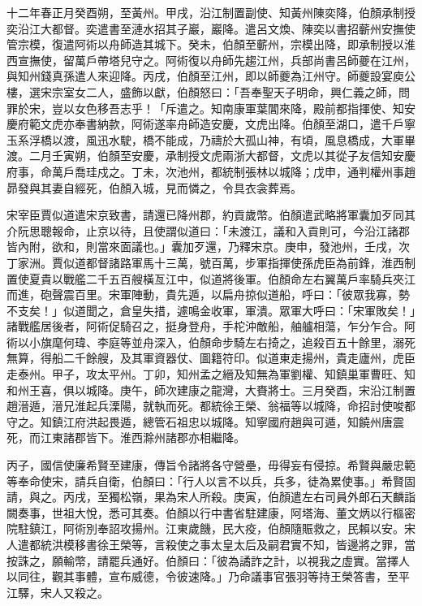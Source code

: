 \begin{pinyinscope}
 十二年春正月癸酉朔，至黃州。甲戌，沿江制置副使、知黃州陳奕降，伯顏承制授奕沿江大都督。奕遣書至漣水招其子巖，巖降。遣呂文煥、陳奕以書招蘄州安撫使管宗模，復遣阿術以舟師造其城下。癸未，伯顏至蘄州，宗模出降，即承制授以淮西宣撫使，留萬戶帶塔兒守之。阿術復以舟師先趨江州，兵部尚書呂師夔在江州，與知州錢真孫遣人來迎降。丙戌，伯顏至江州，即以師夔為江州守。師夔設宴庾公樓，選宋宗室女二人，盛飾以獻，伯顏怒曰：「吾奉聖天子明命，興仁義之師，問罪於宋，豈以女色移吾志乎！「斥遣之。知南康軍葉閶來降，殿前都指揮使、知安慶府範文虎亦奉書納款，阿術遂率舟師造安慶，文虎出降。伯顏至湖口，遣千戶寧玉系浮橋以渡，風迅水駛，橋不能成，乃禱於大孤山神，有頃，風息橋成，大軍畢渡。二月壬寅朔，伯顏至安慶，承制授文虎兩浙大都督，文虎以其從子友信知安慶府事，命萬戶喬珪戍之。丁未，次池州，都統制張林以城降；戊申，通判權州事趙昴發與其妻自經死，伯顏入城，見而憐之，令具衣衾葬焉。



 宋宰臣賈似道遣宋京致書，請還已降州郡，約貢歲幣。伯顏遣武略將軍囊加歹同其介阮思聰報命，止京以待，且使謂似道曰：「未渡江，議和入貢則可，今沿江諸郡皆內附，欲和，則當來面議也。」囊加歹還，乃釋宋京。庚申，發池州，壬戌，次丁家洲。賈似道都督諸路軍馬十三萬，號百萬，步軍指揮使孫虎臣為前鋒，淮西制置使夏貴以戰艦二千五百艘橫亙江中，似道將後軍。伯顏命左右翼萬戶率騎兵夾江而進，砲聲震百里。宋軍陣動，貴先遁，以扁舟掠似道船，呼曰：「彼眾我寡，勢不支矣！」似道聞之，倉皇失措，遽鳴金收軍，軍潰。眾軍大呼曰：「宋軍敗矣！」諸戰艦居後者，阿術促騎召之，挺身登舟，手柁沖敵船，舳艫相蕩，乍分乍合。阿術以小旗麾何瑋、李庭等並舟深入，伯顏命步騎左右掎之，追殺百五十餘里，溺死無算，得船二千餘艘，及其軍資器仗、圖籍符印。似道東走揚州，貴走廬州，虎臣走泰州。甲子，攻太平州。丁卯，知州孟之縉及知無為軍劉權、知鎮巢軍曹旺、知和州王喜，俱以城降。庚午，師次建康之龍灣，大賚將士。三月癸酉，宋沿江制置趙溍遁，溍兄淮起兵溧陽，就執而死。都統徐王榮、翁福等以城降，命招討使唆都守之。知鎮江府洪起畏遁，總管石祖忠以城降。知寧國府趙與可遁，知饒州唐震死，而江東諸郡皆下。淮西滁州諸郡亦相繼降。



 丙子，國信使廉希賢至建康，傳旨令諸將各守營壘，毋得妄有侵掠。希賢與嚴忠範等奉命使宋，請兵自衛，伯顏曰：「行人以言不以兵，兵多，徒為累使事。」希賢固請，與之。丙戌，至獨松嶺，果為宋人所殺。庚寅，伯顏遣左右司員外郎石天麟詣闕奏事，世祖大悅，悉可其奏。伯顏以行中書省駐建康，阿塔海、董文炳以行樞密院駐鎮江，阿術別奉詔攻揚州。江東歲饑，民大疫，伯顏隨賑救之，民賴以安。宋人遣都統洪模移書徐王榮等，言殺使之事太皇太后及嗣君實不知，皆邊將之罪，當按誅之，願輸幣，請罷兵通好。伯顏曰：「彼為譎詐之計，以視我之虛實。當擇人以同往，觀其事體，宣布威德，令彼速降。」乃命議事官張羽等持王榮答書，至平江驛，宋人又殺之。




\end{pinyinscope}
